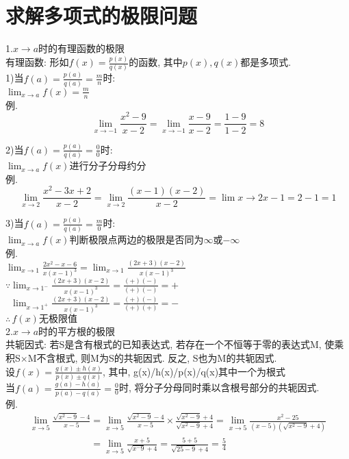 \chapter{求解多项式的极限问题}
1.$x\to a$时的有理函数的极限\\
有理函数: 形如$f(x)=\frac{p(x)}{q(x)}$的函数, 其中$p(x),q(x)$都是多项式.\\
1)当$f(a)=\frac{p(a)}{q(a)}=\frac{m}{n}$时:\\
$\displaystyle\lim_{x\to a}f(x)=\frac{m}{n}$\\
例.
\[\lim_{x\to -1}\frac{x^2-9}{x-2}=\lim_{x\to -1}\frac{x-9}{x-2}=\frac{1-9}{1-2}=8\]

2)当$f(a)=\frac{p(a)}{q(a)}=\frac{0}{0}$时:\\
$\displaystyle\lim_{x\to a}f(x)$进行分子分母约分\\
例.\\
\[\lim_{x\to 2}\frac{x^2-3x+2}{x-2}=\lim_{x\to 2}\frac{(x-1)(x-2)}{x-2}=\lim{x\to 2}x-1=2-1=1\]

3)当$f(a)=\frac{p(a)}{q(a)}=\frac{m}{0}$时:\\
$\displaystyle\lim_{x\to a}f(x)$判断极限点两边的极限是否同为$\infty$或$-\infty$\\
例.\\
$\displaystyle\lim_{x\to 1}\frac{2x^2-x-6}{x(x-1)^3}=\lim_{x\to 1}\frac{(2x+3)(x-2)}{x(x-1)^3}$\\
$\displaystyle\mathbf{\because}\lim_{x\to 1^-}\frac{(2x+3)(x-2)}{x(x-1)^3}=\frac{(+)(-)}{(+)(-)}=+$\\
$\displaystyle\phantom{\because}\lim_{x\to 1^+}\frac{(2x+3)(x-2)}{x(x-1)^3}=\frac{(+)(-)}{(+)(+)}=-$\\
$\displaystyle\mathbf{\therefore}\,f(x)\text{无极限值}$\\[2ex]

2.$x\to a$时的平方根的极限\\
共轭因式: 若S是含有根式的已知表达式, 若存在一个不恒等于零的表达式M, 使乘积S$\times$M不含根式, 则M为S的共轭因式. 反之, S也为M的共轭因式.\\
设$f(x)=\frac{g(x)\pm h(x)}{p(x)\pm q(x)}$, 其中, g(x)/h(x)/p(x)/q(x)其中一个为根式\\
当$f(a)=\frac{g(a)-h(a)}{p(a)-q(a)}=\frac{0}{0}$时, 将分子分母同时乘以含根号部分的共轭因式.\\
例.
\begin{displaymath}
\begin{array}{l}
    \displaystyle\lim_{x\to 5}\frac{\sqrt{x^2-9}-4}{x-5}=\lim_{x\to 5}\frac{\sqrt{x^2-9}-4}{x-5}\times\frac{\sqrt{x^2-9}+4}{\sqrt{x^2-9}+4}=\lim_{x\to 5}\frac{x^2-25}{(x-5)(\sqrt{x^2-9}+4)}\\
    \displaystyle\phantom{\lim_{x\to 5}\frac{\sqrt{x^2-9}-4}{x-5}}=\lim_{x\to 5}\frac{x+5}{\sqrt{x^-9}+4}=\frac{5+5}{\sqrt{25-9}+4}=\frac{5}{4}
\end{array}
\end{displaymath}\vspace{2ex}

